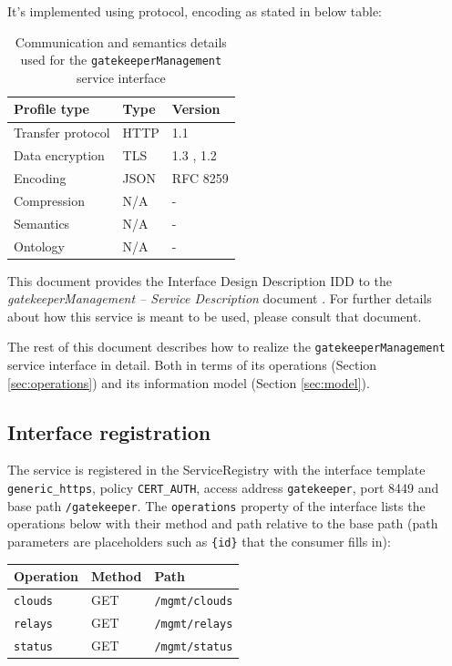 \documentclass[a4paper]{arrowhead}
\begin{document}
It's implemented using protocol, encoding as stated in below table:
\begin{table}[ht!]
  \centering
  \begin{tabular}{|l|l|l|}
    \hline
    \rowcolor{gray!33} Profile type & Type & Version \\ \hline
    Transfer protocol & HTTP & 1.1 \cite{rfc9112} \\ \hline
    Data encryption & TLS & 1.3 \cite{rfc8446}, 1.2 \cite{rfc5246} \\ \hline
    Encoding & JSON & RFC 8259 \cite{rfc8259} \\ \hline
    Compression & N/A & - \\ \hline
    Semantics & N/A & - \\ \hline
    Ontology & N/A & - \\ \hline
  \end{tabular}
  \caption{Communication and semantics details used for the \texttt{gatekeeper\allowbreak{}Management} service interface}
  \label{tab:comunication_semantics_profile}
\end{table}

This document provides the Interface Design Description IDD to the \textit{gatekeeperManagement -- Service Description} document \cite{gk-gatekeeperManagement-sd}.
For further details about how this service is meant to be used, please consult that document.

The rest of this document describes how to realize the \texttt{gatekeeper\allowbreak{}Management} service
interface in detail. Both in terms of its operations (Section \ref{sec:operations}) and its information model (Section \ref{sec:model}).

\subsection{Interface registration}

The service is registered in the ServiceRegistry with the interface template \texttt{generic\_\allowbreak{}https}, policy \texttt{CERT\_\allowbreak{}AUTH}, access address \texttt{gatekeeper}, port 8449 and base path \texttt{/\allowbreak{}gatekeeper}. The \texttt{operations} property of the interface lists the operations below with their method and path relative to the base path (path parameters are placeholders such as \texttt{\{id\}} that the consumer fills in):

\noindent\begin{longtable}{| p{5.2cm} | p{1.6cm} | p{8.4cm} |} \hline
\rowcolor{gray!33} Operation & Method & Path \\ \hline \endhead
\texttt{clouds} & GET & \texttt{/\allowbreak{}mgmt/\allowbreak{}clouds} \\ \hline
\texttt{relays} & GET & \texttt{/\allowbreak{}mgmt/\allowbreak{}relays} \\ \hline
\texttt{status} & GET & \texttt{/\allowbreak{}mgmt/\allowbreak{}status} \\ \hline
\end{longtable}
\end{document}
